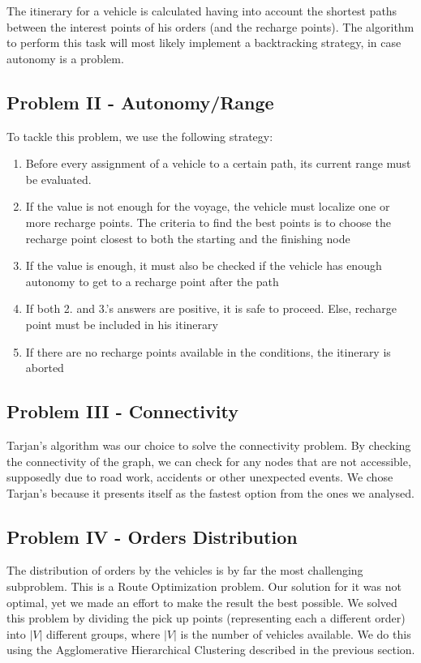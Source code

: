 The itinerary for a vehicle is calculated having into account the shortest paths between the interest points of his orders (and the recharge points). The algorithm to perform this task will most likely implement a backtracking strategy, in case autonomy is a problem.

\subsection{Problem II - Autonomy/Range}
To tackle this problem, we use the following strategy: 
\begin{enumerate}
    \item Before every assignment of a vehicle to a certain path, its current range must be evaluated. 
    \item If the value is not enough for the voyage, the vehicle must localize one or more recharge points. The criteria to find the best points is to choose the recharge point closest to both the starting and the finishing node
    \item If the value is enough, it must also be checked if the vehicle has enough autonomy to get to a recharge point after the path
    \item If both 2. and 3.'s  answers are positive, it is safe to proceed. Else, recharge point must be included in his itinerary
    \item If there are no recharge points available in the conditions, the itinerary is aborted
\end{enumerate}

\subsection{Problem III - Connectivity}
Tarjan's algorithm was our choice to solve the connectivity problem. By checking the connectivity of the graph, we can check for any nodes that are not accessible, supposedly due to road work, accidents or other unexpected events. We chose Tarjan's because it presents itself as the fastest option from the ones we analysed.

\subsection{Problem IV - Orders Distribution}
The distribution of orders by the vehicles is by far the most challenging subproblem. This is a Route Optimization problem. Our solution for it was not optimal, yet we made an effort to make the result the best possible. We solved this problem by dividing the pick up points (representing each a different order) into $|V|$ different groups, where $|V|$ is the number of vehicles available. We do this using the Agglomerative Hierarchical Clustering described in the previous section.

